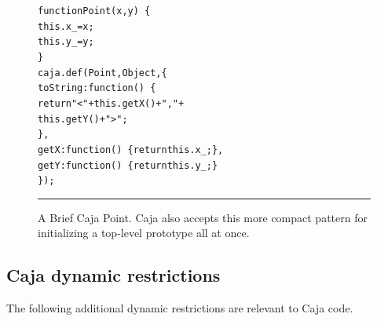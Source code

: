 \documentclass[letterpaper,twocolumn,10pt]{article}
\begin{document}
\begin{figure}[t!]
\begin{alltt}
function Point(x, y)\ \{
  this.x\_ = x;
  this.y\_ = y;
\}
caja.def(Point, Object, \{
  toString: function()\ \{ 
    return "<" + this.getX() + "," + 
                 this.getY() + ">"; 
  \},
  getX: function()\ \{ return this.x\_; \},
  getY: function()\ \{ return this.y\_; \}
\});
\end{alltt}

\caption[A Brief Caja Point.]{A Brief Caja Point. Caja also accepts this more 
compact pattern for initializing a top-level prototype all at once. \\ } 
\hrule
\label{fig:brief-caja-point}
\end{figure}


\subsection{Caja dynamic restrictions}
\label{subsec:caja-dynamic}

The following additional dynamic restrictions are relevant to Caja code.
\end{document}
